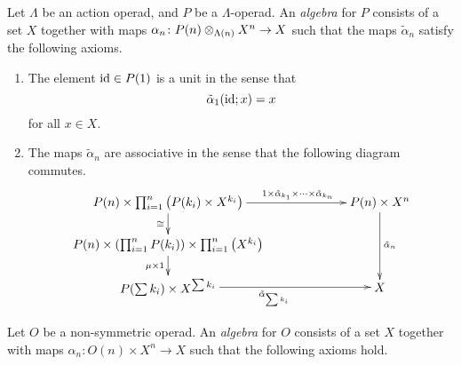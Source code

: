 \begin{Defi}\label{Defi:aop-alg}
Let $\Lambda$ be an action operad, and $P$ be a $\Lambda$-operad. An \textit{algebra} for $P$ consists of a set $X$ together with maps $\alpha_{n} \colon P(n) \otimes_{\Lambda(n)} X^{n} \rightarrow X$ such that the maps $\tilde{\alpha}_{n}$ satisfy the following axioms.
\begin{enumerate}
\item The element $\textrm{id} \in P(1)$ is a unit in the sense that
  \[
    \tilde{\alpha}_{1}(\textrm{id}; x) = x
  \]
for all $x \in X$.
\item The maps $\tilde{\alpha}_{n}$ are associative in the sense that the following diagram commutes.
  \[
    \xy
      (0,0)*+{P(n) \times \prod_{i=1}^n \left(P(k_i) \times X^{k_i}\right)}="ul";
      (60,0)*+{P(n) \times X^{n}}="ur";
      (0,-12)*+{P(n) \times \left(\prod_{i=1}^n P(k_i)\right) \times \prod_{i=1}^n \left(X^{k_i}\right) }="ml";
      (0,-24)*+{P(\sum k_{i}) \times X^{\sum k_{i}}}="bl";
      (60,-24)*+{X}="br";
      {\ar^>>>>>>>>>>>>>>{1 \times \tilde{\alpha}_{k_{1}} \times \cdots \times \tilde{\alpha}_{k_{n}}} "ul"; "ur"};
      {\ar^{\tilde{\alpha}_{n}} "ur"; "br"};
      {\ar_{\cong} "ul"; "ml"};
      {\ar_{\mu \times 1} "ml"; "bl"};
      {\ar_{\tilde{\alpha}_{\sum k_{i}}} "bl"; "br"};
    \endxy
  \]
\end{enumerate}

\end{Defi}

\begin{Defi}\label{opalgax}
Let $O$ be a non-symmetric operad. An \textit{algebra} for $O$ consists of a set $X$ together with maps $\alpha_{n} \colon O(n) \times X^{n} \rightarrow X$ such that the following axioms hold.

\end{Defi}

